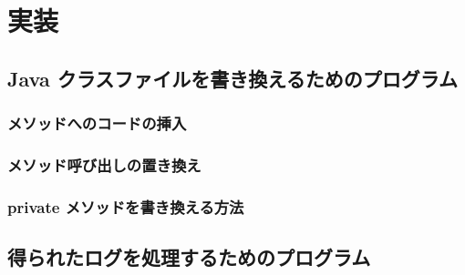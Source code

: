 \section{実装}
\label{sec:instrument}
\subsection{Java クラスファイルを書き換えるためのプログラム}

\subsubsection{メソッドへのコードの挿入}

\subsubsection{メソッド呼び出しの置き換え}

\subsubsection{private メソッドを書き換える方法}

\subsection{得られたログを処理するためのプログラム}